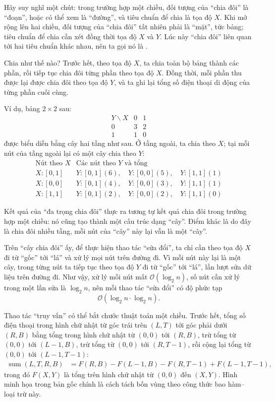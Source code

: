 \documentclass[11pt]{article}
\newcommand{\Oh}{\mathcal{O}}
\begin{document}
Hãy suy nghĩ một chút: trong trường hợp một chiều, đối tượng của ``chia đôi''
là ``đoạn'', hoặc có thể xem là ``đường'', và tiêu chuẩn để chia là tọa độ
\(X\). Khi mở rộng lên hai chiều, đối tượng của ``chia đôi'' tất nhiên phải là
``mặt'', tức bảng; tiêu chuẩn để chia cần xét đồng thời tọa độ \(X\) và
\(Y\). Lúc này ``chia đôi'' liên quan tới hai tiêu chuẩn khác nhau, nên ta gọi
nó là .

Chia như thế nào? Trước hết, theo tọa độ \(X\), ta chia toàn bộ bảng thành các
phần, rồi tiếp tục chia đôi từng phần theo tọa độ \(X\). Đồng thời, mỗi phần
thu được lại được chia đôi theo tọa độ \(Y\), và ta ghi lại tổng số điện thoại
di động của từng phần cuối cùng.

Ví dụ, bảng \(2\times 2\) sau:
\[
\begin{array}{c|cc}
Y\backslash X & 0 & 1\\
\hline
0 & 3 & 2\\
1 & 1 & 0
\end{array}
\]
được biểu diễn bằng cây hai tầng như sau. Ở tầng ngoài, ta chia theo \(X\);
tại mỗi nút của tầng ngoài lại có một cây chia theo \(Y\):
\[
\begin{array}{c|l}
\text{Nút theo }X & \text{Các nút theo }Y\text{ và tổng}\\
\hline
X:[0,1] & Y:[0,1](6),\quad Y:[0,0](5),\quad Y:[1,1](1)\\
X:[0,0] & Y:[0,1](4),\quad Y:[0,0](3),\quad Y:[1,1](1)\\
X:[1,1] & Y:[0,1](2),\quad Y:[0,0](2),\quad Y:[1,1](0)
\end{array}
\]

Kết quả của ``đa trọng chia đôi'' thực ra tương tự kết quả chia đôi trong
trường hợp một chiều: nó cũng tạo thành một cấu trúc dạng ``cây''. Điểm khác
là do đây là chia đôi nhiều tầng, mỗi nút của ``cây'' này lại vẫn là một
``cây''.

Trên ``cây chia đôi'' ấy, để thực hiện thao tác ``sửa đổi'', ta chỉ cần theo
tọa độ \(X\) đi từ ``gốc'' tới ``lá'' và xử lý mọi nút trên đường đi. Vì mỗi
nút này lại là một cây, trong từng nút ta tiếp tục theo tọa độ \(Y\) đi từ
``gốc'' tới ``lá'', lần lượt sửa dữ liệu trên đường đi. Như vậy, xử lý mỗi
nút mất \(\Oh(\log_2 n)\), số nút cần xử lý trong một lần sửa là
\(\log_2 n\), nên mỗi thao tác ``sửa đổi'' có độ phức tạp
\[
  \Oh(\log_2 n\cdot \log_2 n).
\]

Thao tác ``truy vấn'' có thể bắt chước thuật toán một chiều. Trước hết, tổng
số điện thoại trong hình chữ nhật từ góc trái trên \((L,T)\) tới góc phải dưới
\((R,B)\) bằng tổng trong hình chữ nhật từ \((0,0)\) tới \((R,B)\), trừ tổng
từ \((0,0)\) tới \((L-1,B)\), trừ tổng từ \((0,0)\) tới \((R,T-1)\), rồi cộng
lại tổng từ \((0,0)\) tới \((L-1,T-1)\):
\[
\begin{aligned}
  \operatorname{sum}(L,T,R,B)
    &= F(R,B)-F(L-1,B)-F(R,T-1)+F(L-1,T-1),
\end{aligned}
\]
trong đó \(F(X,Y)\) là tổng trên hình chữ nhật từ \((0,0)\) đến \((X,Y)\).
Hình minh họa trong bản gốc chính là cách tách bốn vùng theo công thức bao
hàm--loại trừ này.
\end{document}
